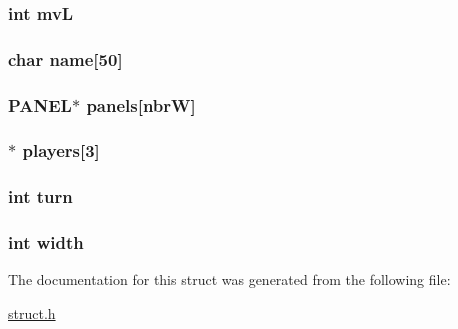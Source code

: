 \subsubsection[{\texorpdfstring{mvL}{mvL}}]{\setlength{\rightskip}{0pt plus 5cm}int mvL}\hypertarget{struct___map_a610a529d29e0a116ba9b47eacecbb962}{}\label{struct___map_a610a529d29e0a116ba9b47eacecbb962}
\subsubsection[{\texorpdfstring{name}{name}}]{\setlength{\rightskip}{0pt plus 5cm}char name\mbox{[}50\mbox{]}}\hypertarget{struct___map_ae5cb967283dbbdf75cb2032c1fa08fee}{}\label{struct___map_ae5cb967283dbbdf75cb2032c1fa08fee}
\subsubsection[{\texorpdfstring{panels}{panels}}]{\setlength{\rightskip}{0pt plus 5cm}P\+A\+N\+EL$\ast$ panels\mbox{[}{\bf nbrW}\mbox{]}}\hypertarget{struct___map_a5b6cf16adf92bcc75c0341ca682861d8}{}\label{struct___map_a5b6cf16adf92bcc75c0341ca682861d8}
\subsubsection[{\texorpdfstring{players}{players}}]{$\ast$ players\mbox{[}3\mbox{]}}\hypertarget{struct___map_a48395d86670996c0e7144aff32feb7be}{}\label{struct___map_a48395d86670996c0e7144aff32feb7be}
\subsubsection[{\texorpdfstring{turn}{turn}}]{\setlength{\rightskip}{0pt plus 5cm}int turn}\hypertarget{struct___map_aaefa47f4fdf865c2358c22b542a993e4}{}\label{struct___map_aaefa47f4fdf865c2358c22b542a993e4}
\subsubsection[{\texorpdfstring{width}{width}}]{\setlength{\rightskip}{0pt plus 5cm}int width}\hypertarget{struct___map_a2474a5474cbff19523a51eb1de01cda4}{}\label{struct___map_a2474a5474cbff19523a51eb1de01cda4}


The documentation for this struct was generated from the following file\+:\begin{DoxyCompactItemize}
\item 
\hyperlink{struct_8h}{struct.\+h}\end{DoxyCompactItemize}
